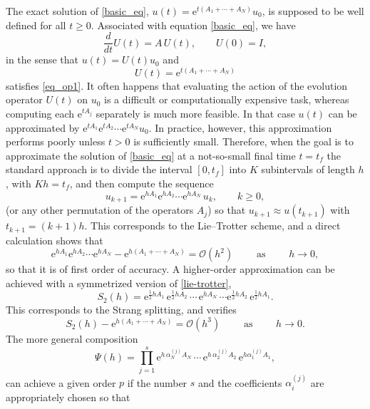 \documentclass[11pt]{article}
\newcommand{\e}{\ensuremath{\mathrm{e}}}
\begin{document}
The exact solution of \eqref{basic_eq}, $u(t) = \e^{t (A_1 + \cdots + A_N)} u_0$, is supposed to be well defined for all $t \ge 0$. Associated
with equation \eqref{basic_eq}, we have
\begin{equation} \label{eq_op1}
  \frac{d }{dt} U(t) = A \, U(t), \qquad U(0) = I,
\end{equation}
in the sense that $u(t) = U(t) u_0$ and
\[
    U(t) = \e^{t (A_1 + \cdots + A_N)}
\]
satisfies \eqref{eq_op1}. It often happens that evaluating the action of the evolution operator $U(t)$ on $u_0$ is a difficult or computationally expensive task,
whereas computing each $\e^{t A_j}$ separately is much more feasible. In that case $u(t)$ can be approximated  by
$\e^{t A_1}  \e^{t A_2} \cdots \e^{t A_N} u_0$. In practice, however, this approximation performs poorly unless $t > 0$
is sufficiently small. Therefore, when the goal is to approximate the solution of \eqref{basic_eq} at a not-so-small final time $t = t_f$
the standard approach is to divide the interval $[0, t_f]$ into $K$ subintervals of length $h$,
with $K h = t_f$, and then compute the sequence
\begin{equation} \label{lie-trotter}
  u_{k+1} =  \e^{h A_1}  \e^{h A_2} \cdots \e^{h A_N} \, u_k, \qquad k \ge 0, 
\end{equation}  
(or any other permutation of the operators $A_j$)
so that $u_{k+1} \approx u(t_{k+1})$ with $t_{k+1} = (k+1)h$.  This corresponds to the Lie--Trotter scheme, and a direct calculation shows that
\[
  \e^{h A_1}  \e^{h A_2} \cdots \e^{h A_N} - \e^{h (A_1 + \cdots + A_N)} = \mathcal{O}(h^2) \qquad \mbox{ as } \qquad h \rightarrow 0,
\]
so that it is of first order of accuracy.  A higher-order approximation can be achieved with a symmetrized version of \eqref{lie-trotter},
\begin{equation} \label{strang}
  S_2(h) = \e^{\frac{1}{2} h A_1} \,  \e^{\frac{1}{2} h A_2} \, \cdots \,  \e^{h A_N} \, \cdots \e^{\frac{1}{2} h A_2} \, \e^{\frac{1}{2} h A_1}.
\end{equation}
This corresponds to the Strang splitting, and verifies
\[
     S_2(h) - \e^{h (A_1 + \cdots + A_N)} = \mathcal{O}(h^3) \qquad \mbox{ as } \qquad h \rightarrow 0.
\]
The more general composition
\begin{equation} \label{gen.split}
  \Psi(h) = \prod_{j=1}^s \e^{h \, \alpha_N^{(j)} A_N} \, \cdots \, \e^{h \, \alpha_2^{(j)} A_2}  \, \e^{h \alpha_1^{(j)} A_1},
\end{equation}
can achieve a given order $p$ 
if the number $s$ and the coefficients $ \alpha_i^{(j)}$ are appropriately chosen so that 
\end{document}
